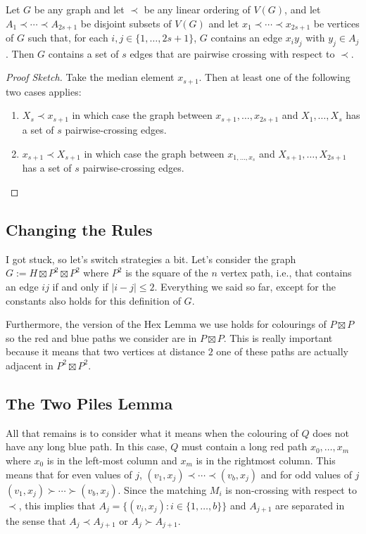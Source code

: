 \documentclass[kpfonts]{patmorin}
\begin{document}
\begin{lem}
    Let $G$ be any graph and let $\prec$ be any linear ordering of $V(G)$, and let $A_{1}\prec\cdots\prec A_{2s+1}$ be disjoint subsets of $V(G)$  and let $x_1\prec\cdots\prec x_{2s+1}$ be vertices of $G$ such that, for each $i,j\in\{1,\ldots,2s+1\}$, $G$ contains an edge $x_iy_j$ with $y_j\in A_j$. Then $G$ contains a set of $s$ edges that are pairwise crossing with respect to $\prec$.
\end{lem}

\begin{proof}[Proof Sketch]
    Take the median element $x_{s+1}$.  Then at least one of the following two cases applies:
    \begin{enumerate}
        \item $X_s\prec x_{s+1}$ in which case the graph between $x_{s+1},\ldots,x_{2s+1}$ and $X_1,\ldots,X_s$ has a set of $s$ pairwise-crossing edges.
        \item $x_{s+1}\prec X_{s+1}$ in which case the graph between $x_{1,\ldots,x_s}$ and $X_{s+1},\ldots,X_{2s+1}$ has a set of $s$ pairwise-crossing edges. \qedhere
    \end{enumerate}
\end{proof}

\subsection{Changing the Rules}

I got stuck, so let's switch strategies a bit.  Let's consider the graph $G:=H\boxtimes P^2\boxtimes P^2$ where $P^2$ is the square of the $n$ vertex path, i.e., that contains an edge $ij$ if and only if $|i-j|\le 2$.  Everything we said so far, except for the constants also holds for this definition of $G$.

Furthermore, the version of the Hex Lemma we use holds for colourings of $P\boxtimes P$ so the red and blue paths we consider are in $P\boxtimes P$.  This is really important because it means that two vertices at distance $2$ one of these paths are actually adjacent in $P^2\boxtimes P^2$.

\subsection{The Two Piles Lemma}

All that remains is to consider what it means when the colouring of $Q$ does not have any long blue path. In this case, $Q$ must contain a long red path $x_0,\ldots,x_m$ where $x_0$ is in the left-most column and $x_m$ is in the rightmost column.  This means that for even values of $j$, $(v_1,x_j)\prec\cdots\prec(v_b,x_j)$ and for odd values of $j$ $(v_1,x_j)\succ\cdots\succ(v_b,x_j)$.   Since the matching $M_i$ is non-crossing with respect to $\prec$, this implies that $A_j=\{(v_i,x_j):i\in\{1,\ldots,b\}\}$ and $A_{j+1}$ are separated in the sense that $A_j \prec A_{j+1}$ or $A_j\succ A_{j+1}$.
\end{document}
